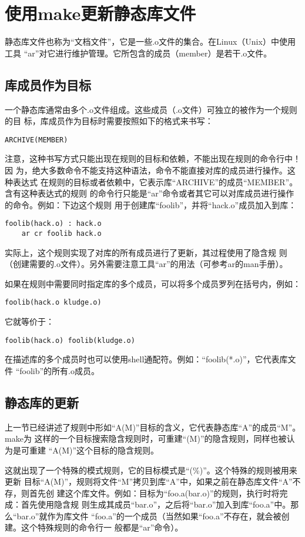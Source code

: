 ﻿\chapter{使用make更新静态库文件}
静态库文件也称为“文档文件”，它是一些.o文件的集合。在Linux（Unix）中使用工具
“ar”对它进行维护管理。它所包含的成员（member）是若干.o文件。

\section{库成员作为目标}
一个静态库通常由多个.o文件组成。这些成员（.o文件）可独立的被作为一个规则的目
标，库成员作为目标时需要按照如下的格式来书写：

\begin{Verbatim}[]
ARCHIVE(MEMBER)
\end{Verbatim}

注意，这种书写方式只能出现在规则的目标和依赖，不能出现在规则的命令行中！因
为，绝大多数命令不能支持这种语法，命令不能直接对库的成员进行操作。这种表达式
在规则的目标或者依赖中，它表示库“ARCHIVE”的成员“MEMBER”。含有这种表达式的规则
的命令行只能是“ar”命令或者其它可以对库成员进行操作的命令。例如：下边这个规则
用于创建库“foolib”，并将“hack.o”成员加入到库：
\begin{Verbatim}[]
foolib(hack.o) : hack.o
    ar cr foolib hack.o
\end{Verbatim}
\noindent 实际上，这个规则实现了对库的所有成员进行了更新，其过程使用了隐含规
则（创建需要的.o文件）。另外需要注意工具“ar”的用法（可参考ar的man手册）。

如果在规则中需要同时指定库的多个成员，可以将多个成员罗列在括号内，例如：
\begin{Verbatim}[]
foolib(hack.o kludge.o)
\end{Verbatim}
\noindent 它就等价于：
\begin{Verbatim}[]
foolib(hack.o) foolib(kludge.o)
\end{Verbatim}
在描述库的多个成员时也可以使用shell通配符。例如：“foolib(*.o)”，它代表库文件
“foolib”的所有.o成员。

\section{静态库的更新}
上一节已经讲述了规则中形如“A(M)”目标的含义，它代表静态库“A”的成员“M”。make为
这样的一个目标搜索隐含规则时，可重建“(M)”的隐含规则，同样也被认为是可重建
“A(M)”这个目标的隐含规则。

这就出现了一个特殊的模式规则，它的目标模式是“(\%)”。这个特殊的规则被用来更新
目标“A(M)”，规则将文件“M”拷贝到库“A”中，如果之前在静态库文件“A”不存，则首先创
建这个库文件。例如：目标为“foo.a(bar.o)”的规则，执行时将完成：首先使用隐含规
则生成其成员“bar.o”，之后将“bar.o”加入到库“foo.a”中。那么“bar.o”就作为库文件
“foo.a”的一个成员（当然如果“foo.a”不存在，就会被创建。这个特殊规则的命令行一
般都是“ar”命令）。

